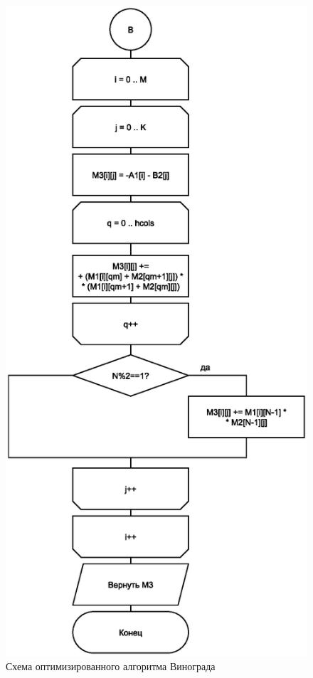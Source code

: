 \begin{figure}[h]
	\centering
	\includegraphics[scale=0.75]{img/vinograd-2-opt.eps}
	\caption{Схема оптимизированного алгоритма Винограда}
	\label{fig:vinograd_opt}
\end{figure}

